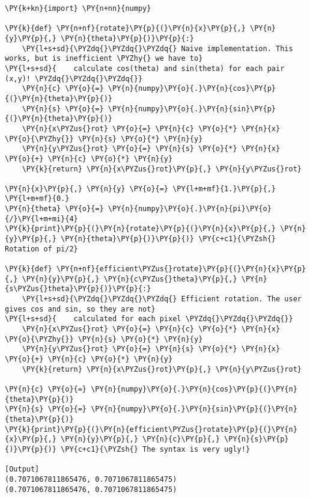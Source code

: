 \begin{Verbatim}[label=\makebox{\url{https://github.com/lucabaldini/cmepda/tree/master/slides/latex/snippets/rotation\_naive.py}},commandchars=\\\{\}]
\PY{k+kn}{import} \PY{n+nn}{numpy}

\PY{k}{def} \PY{n+nf}{rotate}\PY{p}{(}\PY{n}{x}\PY{p}{,} \PY{n}{y}\PY{p}{,} \PY{n}{theta}\PY{p}{)}\PY{p}{:}
    \PY{l+s+sd}{\PYZdq{}\PYZdq{}\PYZdq{} Naive implementation. This works, but is inefficient \PYZhy{} we have to}
\PY{l+s+sd}{    calculate cos(theta) and sin(theta) for each pair (x,y)! \PYZdq{}\PYZdq{}\PYZdq{}}
    \PY{n}{c} \PY{o}{=} \PY{n}{numpy}\PY{o}{.}\PY{n}{cos}\PY{p}{(}\PY{n}{theta}\PY{p}{)}
    \PY{n}{s} \PY{o}{=} \PY{n}{numpy}\PY{o}{.}\PY{n}{sin}\PY{p}{(}\PY{n}{theta}\PY{p}{)}
    \PY{n}{x\PYZus{}rot} \PY{o}{=} \PY{n}{c} \PY{o}{*} \PY{n}{x} \PY{o}{\PYZhy{}} \PY{n}{s} \PY{o}{*} \PY{n}{y}
    \PY{n}{y\PYZus{}rot} \PY{o}{=} \PY{n}{s} \PY{o}{*} \PY{n}{x} \PY{o}{+} \PY{n}{c} \PY{o}{*} \PY{n}{y}
    \PY{k}{return} \PY{n}{x\PYZus{}rot}\PY{p}{,} \PY{n}{y\PYZus{}rot}

\PY{n}{x}\PY{p}{,} \PY{n}{y} \PY{o}{=} \PY{l+m+mf}{1.}\PY{p}{,} \PY{l+m+mf}{0.}
\PY{n}{theta} \PY{o}{=} \PY{n}{numpy}\PY{o}{.}\PY{n}{pi}\PY{o}{/}\PY{l+m+mi}{4}
\PY{k}{print}\PY{p}{(}\PY{n}{rotate}\PY{p}{(}\PY{n}{x}\PY{p}{,} \PY{n}{y}\PY{p}{,} \PY{n}{theta}\PY{p}{)}\PY{p}{)} \PY{c+c1}{\PYZsh{} Rotation of pi/2}
    
\PY{k}{def} \PY{n+nf}{efficient\PYZus{}rotate}\PY{p}{(}\PY{n}{x}\PY{p}{,} \PY{n}{y}\PY{p}{,} \PY{n}{c\PYZus{}theta}\PY{p}{,} \PY{n}{s\PYZus{}theta}\PY{p}{)}\PY{p}{:}
    \PY{l+s+sd}{\PYZdq{}\PYZdq{}\PYZdq{} Efficient rotation. The user gives cos and sin, so they are not}
\PY{l+s+sd}{    calculated for each pixel \PYZdq{}\PYZdq{}\PYZdq{}}
    \PY{n}{x\PYZus{}rot} \PY{o}{=} \PY{n}{c} \PY{o}{*} \PY{n}{x} \PY{o}{\PYZhy{}} \PY{n}{s} \PY{o}{*} \PY{n}{y}
    \PY{n}{y\PYZus{}rot} \PY{o}{=} \PY{n}{s} \PY{o}{*} \PY{n}{x} \PY{o}{+} \PY{n}{c} \PY{o}{*} \PY{n}{y}
    \PY{k}{return} \PY{n}{x\PYZus{}rot}\PY{p}{,} \PY{n}{y\PYZus{}rot}
    
\PY{n}{c} \PY{o}{=} \PY{n}{numpy}\PY{o}{.}\PY{n}{cos}\PY{p}{(}\PY{n}{theta}\PY{p}{)}
\PY{n}{s} \PY{o}{=} \PY{n}{numpy}\PY{o}{.}\PY{n}{sin}\PY{p}{(}\PY{n}{theta}\PY{p}{)}
\PY{k}{print}\PY{p}{(}\PY{n}{efficient\PYZus{}rotate}\PY{p}{(}\PY{n}{x}\PY{p}{,} \PY{n}{y}\PY{p}{,} \PY{n}{c}\PY{p}{,} \PY{n}{s}\PY{p}{)}\PY{p}{)} \PY{c+c1}{\PYZsh{} The syntax is very ugly!}

[Output]
(0.7071067811865476, 0.7071067811865475)
(0.7071067811865476, 0.7071067811865475)
\end{Verbatim}